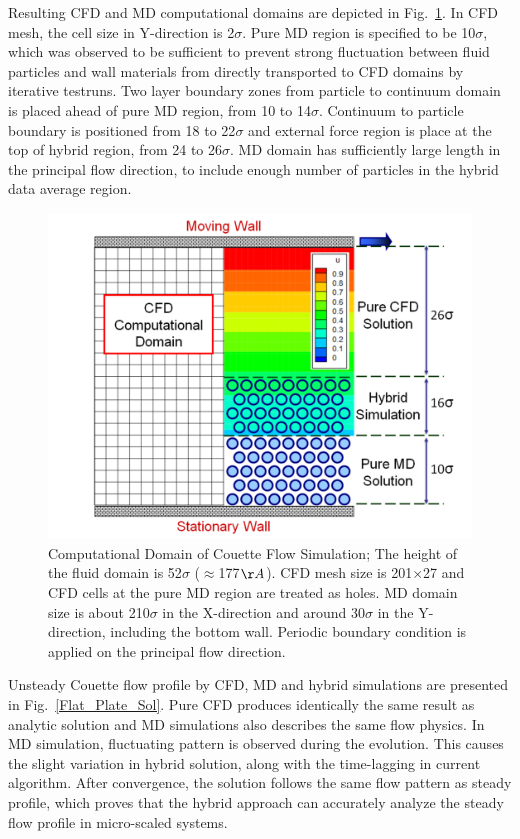 \documentclass[conference,final]{IEEEtran}
\begin{document}
Resulting CFD and MD computational domains are depicted in Fig.~\ref{Couette_Val_Domain}. In CFD mesh, the cell size in Y-direction is 2$\sigma$. Pure MD region is specified to be 10$\sigma$, which was observed to be sufficient to prevent strong fluctuation between fluid particles and wall materials from directly transported to CFD domains by iterative testruns. Two layer boundary zones from particle to continuum domain is placed ahead of pure MD region, from 10 to 14$\sigma$. Continuum to particle boundary is positioned from 18 to 22$\sigma$ and external force region is place at the top of hybrid region, from 24 to 26$\sigma$. MD domain has sufficiently large length in the principal flow direction, to include enough number of particles in the hybrid data average region.

%
\begin{figure}[ht]
\centering
\includegraphics[width=1.0\linewidth]{Couette_Val_Domain.pdf}
\vskip-0.2cm
\caption{\small Computational Domain of Couette Flow Simulation; The height of the fluid domain is 52$\sigma$ ($\approx$177$\AA$). CFD mesh size is 201$\times$27 and CFD cells at the pure MD region are treated as holes. MD domain size is about 210$\sigma$ in the X-direction and around 30$\sigma$ in the Y-direction, including the bottom wall. Periodic boundary condition is applied on the principal flow direction.}
\label{Couette_Val_Domain}
\end{figure}






Unsteady Couette flow profile by CFD, MD and hybrid simulations are presented in Fig.~\ref{Flat_Plate_Sol}. Pure CFD produces identically the same result as analytic solution and MD simulations also describes the same flow physics. In MD simulation, fluctuating pattern is observed during the evolution. This causes the slight variation in hybrid solution, along with the time-lagging in current algorithm. After convergence, the solution follows the same flow pattern as steady profile, which proves that the hybrid approach can accurately analyze the steady flow profile in micro-scaled systems.
\end{document}
